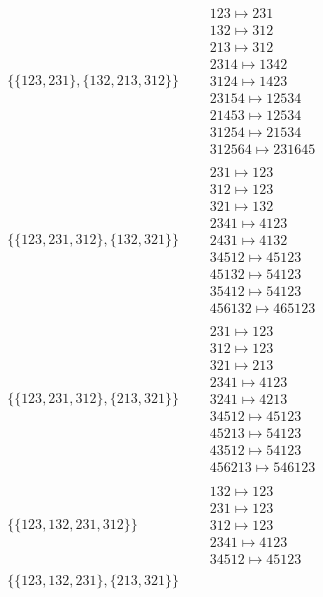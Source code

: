 \begin{tiny}
\begin{align}
\begin{matrix}
\end{matrix}
\\
\{\{123, 231\}, \{132, 213, 312\}\}
\quad
&
\begin{matrix}
123 \mapsto 231\\132 \mapsto 312\\213 \mapsto 312\\2314 \mapsto 1342\\3124 \mapsto 1423\\23154 \mapsto 12534\\21453 \mapsto 12534\\31254 \mapsto 21534\\312564 \mapsto 231645
\end{matrix}
\\
\{\{123, 231, 312\}, \{132, 321\}\}
\quad
&
\begin{matrix}
231 \mapsto 123\\312 \mapsto 123\\321 \mapsto 132\\2341 \mapsto 4123\\2431 \mapsto 4132\\34512 \mapsto 45123\\45132 \mapsto 54123\\35412 \mapsto 54123\\456132 \mapsto 465123
\end{matrix}
\\
\{\{123, 231, 312\}, \{213, 321\}\}
\quad
&
\begin{matrix}
231 \mapsto 123\\312 \mapsto 123\\321 \mapsto 213\\2341 \mapsto 4123\\3241 \mapsto 4213\\34512 \mapsto 45123\\45213 \mapsto 54123\\43512 \mapsto 54123\\456213 \mapsto 546123
\end{matrix}
\\
\{\{123, 132, 231, 312\}\}
\quad
&
\begin{matrix}
132 \mapsto 123\\231 \mapsto 123\\312 \mapsto 123\\2341 \mapsto 4123\\34512 \mapsto 45123
\end{matrix}
\\
\{\{123, 132, 231\}, \{213, 321\}\}

\end{align}
\end{tiny}
